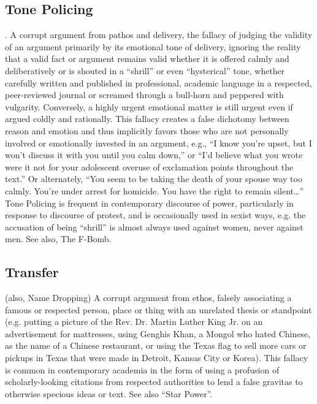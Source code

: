 \documentclass[10pt,a4paper,british]{article}
\begin{document}
\begin{multicols}{2}
    \subsection{Tone Policing}. A corrupt argument from pathos and delivery, the fallacy of judging the validity of an argument primarily by its emotional tone of delivery, ignoring the reality that a valid fact or argument remains valid whether it is offered calmly and deliberatively or is shouted in a ``shrill'' or even ``hysterical'' tone, whether carefully written and published in professional, academic language in a respected, peer{-}reviewed journal or screamed through a bull{-}horn and peppered with vulgarity. Conversely, a highly urgent emotional matter is still urgent even if argued coldly and rationally.  This fallacy creates a false dichotomy between reason and emotion and thus implicitly favors those who are not personally involved or emotionally invested in an argument, e.g., ``I know you're upset, but I won't discuss it with you until you calm down,'' or ``I'd believe what you wrote were it not for your adolescent overuse of exclamation points throughout the text.'' Or alternately, ``You seem to be taking the death of your spouse way too calmly. You're under arrest for homicide. You have the right to remain silent\ldots'' Tone Policing is frequent in contemporary discourse of power, particularly in response to discourse of protest, and is occasionally used in sexist ways, e.g. the accusation of being ``shrill'' is almost always used against women, never against men. See also, The F{-}Bomb.  

    \subsection{Transfer} (also, Name Dropping) A corrupt argument from ethos, falsely associating a famous or respected person, place or thing with an unrelated thesis or standpoint (e.g. putting a picture of the Rev. Dr.  Martin Luther King Jr. on an advertisement for mattresses, using Genghis Khan, a Mongol who hated Chinese, as the name of a Chinese restaurant, or using the Texas flag to sell more cars or pickups in Texas that were made in Detroit, Kansas City or Korea). This fallacy is common in contemporary academia in the form of using a profusion of scholarly{-}looking citations from respected authorities to lend a false gravitas to otherwise specious ideas or text. See also ``Star Power''.  


\end{multicols}
\end{document}
